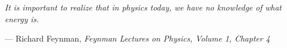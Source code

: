 \thispagestyle{empty}

\vspace*{\fill}

\begin{minipage}{0.865\textwidth}%
  \begin{center}
    \begin{minipage}{0.80\textwidth}%
      \begin{flushleft}
        \textit{%
          It is important to realize that in physics today, we have no knowledge of what energy \emph{is}.
        }
      \end{flushleft}
      \begin{flushleft}
        \small--- Richard Feynman, \textit{Feynman Lectures on Physics, Volume 1, Chapter 4}
      \end{flushleft}
    \end{minipage}%
  \end{center}
\end{minipage}

\vspace*{\fill}

\cleardoublepage
